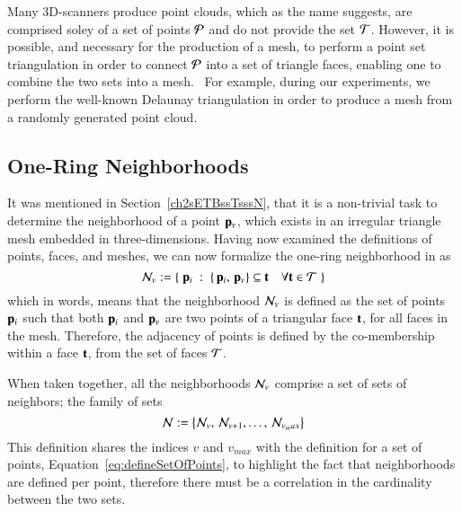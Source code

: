 Many 3D-scanners produce point clouds, which as the name suggests, are comprised soley of a set of points $\mathcal{P}$ and do not provide the set $\mathcal{T}$. However, it is possible, and necessary for the production of a mesh, to perform a point set triangulation in order to connect $\mathcal{P}$ into a set of triangle faces, enabling one to combine the two sets into a mesh.~\cite[p.~26]{Mara12} For example, during our experiments, we perform the well-known Delaunay triangulation in order to produce a mesh from a randomly generated point cloud.

%
%
%
%
\subsection{One-Ring Neighborhoods}
\label{ch2s3ssORN}
It was mentioned in Section~\ref{ch2sETBssTsssN}, that it is a non-trivial task to determine the neighborhood of a point $\mathbf{p}_v$, which exists in an irregular triangle mesh embedded in three-dimensions. Having now examined the definitions of points, faces, and meshes, we can now formalize the one-ring neighborhood in \tdd{} as
%
\begin{equation}
	\mathcal{N}_v := \left \{\;\mathbf{p}_i\;:\;\left \{\,\mathbf{p}_i,\,\mathbf{p}_v\right \} \subseteq \mathbf{t} \quad \forall \mathbf{t} \in \mathcal{T}\;\right \}
	\label{eq:defineNeighborhood}
\end{equation}%
%
%
%
which in words, means that the neighborhood $\mathcal{N}_v$ is defined as the set of points $\mathbf{p}_i$ such that both $\mathbf{p}_i$ and $\mathbf{p}_v$ are two points of a triangular face $\mathbf{t}$, for all faces in the mesh. Therefore, the adjacency of points is defined by the co-membership within a face $\mathbf{t}$, from the set of faces $\mathcal{T}$.

When taken together, all the neighborhoods $\mathcal{N}_v$ comprise a set of sets of neighbors; the family of sets
%
\begin{equation}
	\mathcal{N} := \left \{\mathcal{N}_v,\,\mathcal{N}_{v+1},\ldots,\,\mathcal{N}_{v_max}\right \}
	\label{eq:defineNeighborhood}
\end{equation}%
%
This definition shares the indices $v$ and $v_{max}$ with the definition for a set of points, Equation~\ref{eq:defineSetOfPoints}, to highlight the fact that neighborhoods are defined per point, therefore there must be a correlation in the cardinality between the two sets.

